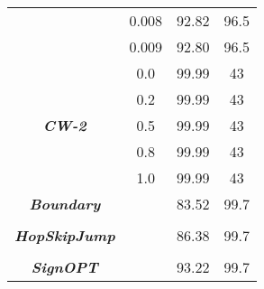 \documentclass[conference]{IEEEtran}
\begin{document}
\begin{minipage}{\textwidth}
\begin{table*}[H]
\begin{tabular}{|c|c|c|c|}
			& 0.008 & 92.82 & 96.5
			\\
			
			& 0.009 & 92.80 & 96.5
			\\
			\hline
			\multirow{5}{*}{\textbf{\textsl{CW-2}}}& 0.0 & 99.99 & 43
			\\
			
			& 0.2 & 99.99 & 43
			\\
			
			& 0.5 & 99.99 & 43
			\\
			
			& 0.8 & 99.99 & 43
			\\
			
			& 1.0 & 99.99 & 43
			\\
			\hline
			\textbf{\textsl{Boundary}} &  & 83.52 & 99.7
			\\
			\hline
			&  &  & 
			\\
			\hline
			\textbf{\textsl{HopSkipJump}} &  & 86.38 & 99.7
			\\
			\hline
			&  &  & 
			\\
			\hline
			\textbf{\textsl{SignOPT}} &  & 93.22 & 99.7
			\\
			\hline
		\end{tabular}		
	\end{table*}
	\end{minipage}
	
\end{document}

